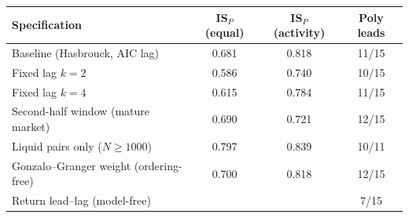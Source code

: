\begin{tabular}{lccc}
\toprule
Specification & IS$_P$ (equal) & IS$_P$ (activity) & Poly leads \\
\midrule
Baseline (Hasbrouck, AIC lag) & 0.681 & 0.818 & 11/15 \\
Fixed lag $k=2$ & 0.586 & 0.740 & 10/15 \\
Fixed lag $k=4$ & 0.615 & 0.784 & 11/15 \\
Second-half window (mature market) & 0.690 & 0.721 & 12/15 \\
Liquid pairs only ($N\ge1000$) & 0.797 & 0.839 & 10/11 \\
Gonzalo--Granger weight (ordering-free) & 0.700 & 0.818 & 12/15 \\
Return lead--lag (model-free) &  &  & 7/15 \\
\bottomrule
\end{tabular}